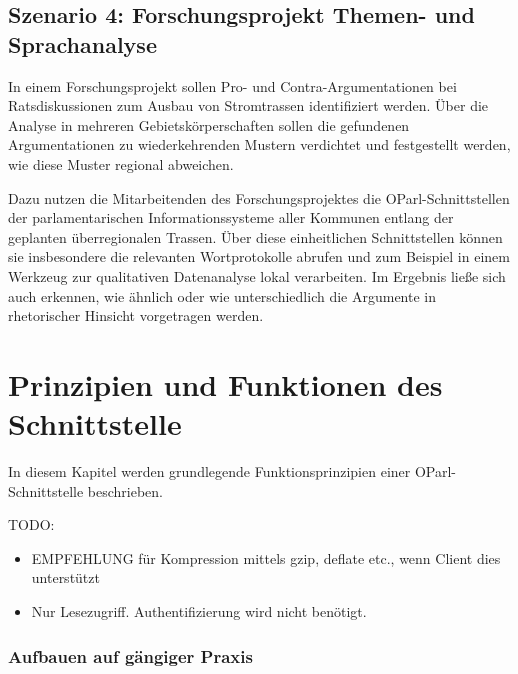 \documentclass[,a4paper]{article}
\begin{document}
\subsection{Szenario 4: Forschungsprojekt Themen- und
Sprachanalyse}\label{szenarioux5fforschung}

In einem Forschungsprojekt sollen Pro- und Contra-Argumentationen bei
Ratsdiskussionen zum Ausbau von Stromtrassen identifiziert werden. Über
die Analyse in mehreren Gebietskörperschaften sollen die gefundenen
Argumentationen zu wiederkehrenden Mustern verdichtet und festgestellt
werden, wie diese Muster regional abweichen.

Dazu nutzen die Mitarbeitenden des Forschungsprojektes die
OParl-Schnittstellen der parlamentarischen Informationssysteme aller
Kommunen entlang der geplanten überregionalen Trassen. Über diese
einheitlichen Schnittstellen können sie insbesondere die relevanten
Wortprotokolle abrufen und zum Beispiel in einem Werkzeug zur
qualitativen Datenanalyse lokal verarbeiten. Im Ergebnis ließe sich auch
erkennen, wie ähnlich oder wie unterschiedlich die Argumente in
rhetorischer Hinsicht vorgetragen werden.

\section{Prinzipien und Funktionen des
Schnittstelle}\label{prinzipien-und-funktionen-des-schnittstelle}

In diesem Kapitel werden grundlegende Funktionsprinzipien einer
OParl-Schnittstelle beschrieben.

TODO:

\begin{itemize}
\itemsep1pt\parskip0pt
\item
  EMPFEHLUNG für Kompression mittels gzip, deflate etc., wenn Client
  dies unterstützt
\item
  Nur Lesezugriff. Authentifizierung wird nicht benötigt.
\end{itemize}


\subsubsection{Aufbauen auf gängiger
Praxis}\label{aufbauen-auf-guxe4ngiger-praxis}
\end{document}
